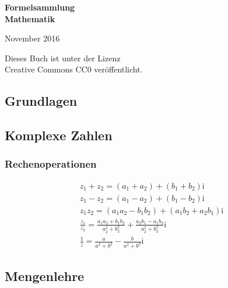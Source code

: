\documentclass[a4paper,10pt,fleqn,onecolumn,twoside]{book}
\numberwithin{equation}{chapter}
\newcommand{\ui}{\mathrm i}
\begin{document}

\begin{titlepage}
\centering
\phantom{x}

\vspace{20em}
{\noindent\Huge\textbf{Formelsammlung\\
Mathematik}}

\vspace{2em}
{\Large November 2016}\\
\end{titlepage}

\noindent
Dieses Buch ist unter der Lizenz\\
Creative Commons CC0 veröffentlicht.

\tableofcontents

\begin{multicols}{2}
\chapter{Grundlagen}
\section{Komplexe Zahlen}
\subsection{Rechenoperationen}

\begin{gather}
z_1+z_2 = (a_1+a_2)+(b_1+b_2)\ui\\
z_1-z_2 = (a_1-a_2)+(b_1-b_2)\ui\\
z_1 z_2 = (a_1 a_2 - b_1 b_2)+(a_1 b_2+a_2 b_1)\ui\\
\frac{z_1}{z_2}
= \frac{a_1 a_2 + b_1 b_2}{a_2^2+b_2^2}
+ \frac{a_2 b_1 - a_1 b_2}{a_2^2+b_2^2}\ui\\
\frac{1}{z} = \frac{a}{a^2+b^2}-\frac{b}{a^2+b^2}\ui
\end{gather}

\end{multicols}
\section{Mengenlehre}
\end{document}
